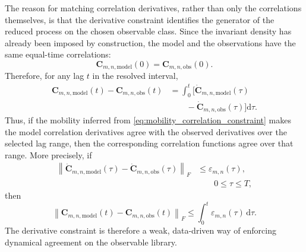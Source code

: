 \documentclass[11pt,twoside,fleqn]{article}
\renewcommand{\d}{\mathrm{d}}
\begin{document}
The reason for matching correlation derivatives, rather than only the correlations themselves, is that the derivative constraint identifies the generator of the reduced process on the chosen observable class. Since the invariant density has already been imposed by construction, the model and the observations have the same equal-time correlations:
\begin{equation}
    \bm{C}_{m,n,\mathrm{model}}(0)
    =
    \bm{C}_{m,n,\mathrm{obs}}(0).
    \label{eq:correlation_initial_match}
\end{equation}
Therefore, for any lag $t$ in the resolved interval,
\begin{equation}
\begin{aligned}
    \bm{C}_{m,n,\mathrm{model}}(t)
    -
    \bm{C}_{m,n,\mathrm{obs}}(t)
    &=
    \int_0^t
    \Big[
        \dot{\bm{C}}_{m,n,\mathrm{model}}(\tau)
        \\
    &\qquad-
        \dot{\bm{C}}_{m,n,\mathrm{obs}}(\tau)
    \Big]\d \tau .
\end{aligned}
    \label{eq:correlation_error_integral}
\end{equation}
Thus, if the mobility inferred from \eqref{eq:mobility_correlation_constraint} makes the model correlation derivatives agree with the observed derivatives over the selected lag range, then the corresponding correlation functions agree over that range. More precisely, if
\begin{equation}
\begin{aligned}
    \left\|
        \dot{\bm{C}}_{m,n,\mathrm{model}}(\tau)
        -
        \dot{\bm{C}}_{m,n,\mathrm{obs}}(\tau)
    \right\|_F
    &\leq
    \varepsilon_{m,n}(\tau),
    \\
    &\qquad
    0\leq \tau\leq T,
\end{aligned}
    \label{eq:correlation_derivative_error_bound}
\end{equation}
then
\begin{equation}
    \left\|
        \bm{C}_{m,n,\mathrm{model}}(t)
        -
        \bm{C}_{m,n,\mathrm{obs}}(t)
    \right\|_F
    \leq
    \int_0^t
        \varepsilon_{m,n}(\tau)\,\d \tau .
    \label{eq:correlation_error_bound}
\end{equation}
The derivative constraint is therefore a weak, data-driven way of enforcing dynamical agreement on the observable library.
\end{document}
